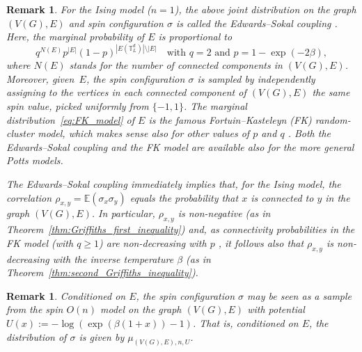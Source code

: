 \documentclass[12pt,reqno]{article}
\def\E{\mathbb{E}}
\def\T{\mathbb{T}}
\newtheorem{remark}[theorem]{Remark}
\begin{document}
\begin{remark}\label{rem:edwards_sokal}
  For the Ising model ($n=1$), the above joint distribution on the graph $(V(G), E)$ and spin configuration $\sigma$ is called the \emph{Edwards--Sokal coupling} \cite{EdwSok88}. Here, the marginal probability of $E$ is proportional to
  \begin{equation}\label{eq:FK_model}
    q^{N(E)} p^{|E|} \left(1-p\right)^{|E(\T_L^d)|\setminus |E|}\quad\text{with $q = 2$ and $p = 1 - \exp(-2\beta)$},
  \end{equation}
  where $N(E)$ stands for the number of connected components in $(V(G),E)$. Moreover, given~$E$, the spin configuration $\sigma$ is sampled by independently assigning to the vertices in each connected component of $(V(G),E)$ the same spin value, picked uniformly from $\{-1,1\}$. The marginal distribution~\eqref{eq:FK_model} of $E$ is the famous \emph{Fortuin--Kasteleyn (FK) random-cluster model}, which makes sense also for other values of $p$ and $q$ \cite{Gri06}. Both the Edwards--Sokal coupling and the FK model are available also for the more general \emph{Potts models}.


  The Edwards--Sokal coupling immediately implies that, for the Ising model, the correlation $\rho_{x,y}=\E(\sigma_x \sigma_y)$ equals the probability that $x$ is connected to $y$ in the graph $(V(G), E)$. In particular, $\rho_{x,y}$ is non-negative (as in Theorem~\ref{thm:Griffiths_first_inequality}) and, as connectivity probabilities in the FK model (with $q\ge 1$) are non-decreasing with $p$ \cite[Theorem 3.21]{Gri06}, it follows also that $\rho_{x,y}$ is non-decreasing with the inverse temperature $\beta$ (as in Theorem~\ref{thm:second_Griffiths_inequality}).
\end{remark}

\begin{remark}
Conditioned on $E$, the spin configuration $\sigma$ may be seen as a sample from the spin $O(n)$ model on the graph $(V(G),E)$ with potential $U(x) := -\log(\exp(\beta(1+x))-1)$. That is, conditioned on $E$, the distribution of $\sigma$ is given by $\mu_{(V(G),E),n,U}$.
\end{remark}
\end{document}
